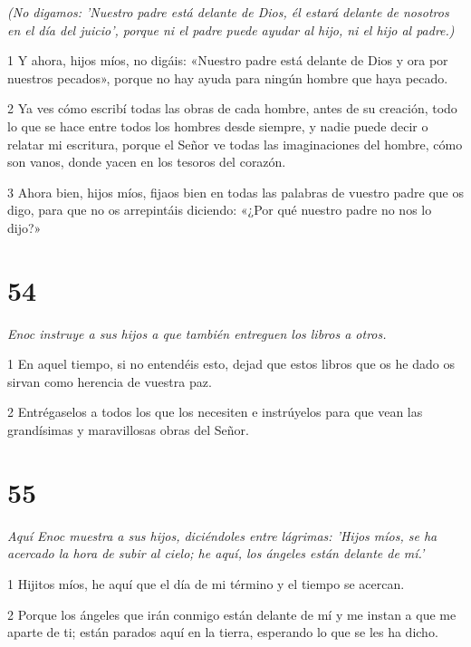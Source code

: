 \par \textit{(No digamos: 'Nuestro padre está delante de Dios, él estará delante de nosotros en el día del juicio', porque ni el padre puede ayudar al hijo, ni el hijo al padre.)}

\par 1 Y ahora, hijos míos, no digáis: «Nuestro padre está delante de Dios y ora por nuestros pecados», porque no hay ayuda para ningún hombre que haya pecado.

\par 2 Ya ves cómo escribí todas las obras de cada hombre, antes de su creación, todo lo que se hace entre todos los hombres desde siempre, y nadie puede decir o relatar mi escritura, porque el Señor ve todas las imaginaciones del hombre, cómo son vanos, donde yacen en los tesoros del corazón.

\par 3 Ahora bien, hijos míos, fijaos bien en todas las palabras de vuestro padre que os digo, para que no os arrepintáis diciendo: «¿Por qué nuestro padre no nos lo dijo?»

\chapter{54}

\par \textit{Enoc instruye a sus hijos a que también entreguen los libros a otros.}

\par 1 En aquel tiempo, si no entendéis esto, dejad que estos libros que os he dado os sirvan como herencia de vuestra paz.

\par 2 Entrégaselos a todos los que los necesiten e instrúyelos para que vean las grandísimas y maravillosas obras del Señor.



\chapter{55}

\par \textit{Aquí Enoc muestra a sus hijos, diciéndoles entre lágrimas: 'Hijos míos, se ha acercado la hora de subir al cielo; he aquí, los ángeles están delante de mí.'}

\par 1 Hijitos míos, he aquí que el día de mi término y el tiempo se acercan.

\par 2 Porque los ángeles que irán conmigo están delante de mí y me instan a que me aparte de ti; están parados aquí en la tierra, esperando lo que se les ha dicho.

